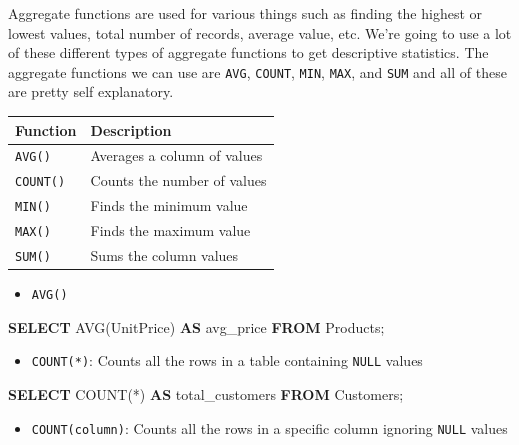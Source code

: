 \documentclass[]{book}
\newenvironment{Shaded}{\begin{snugshade}}{\end{snugshade}}
\newcommand{\KeywordTok}[1]{\textcolor[rgb]{0.13,0.29,0.53}{\textbf{{#1}}}}
\newcommand{\FunctionTok}[1]{\textcolor[rgb]{0.00,0.00,0.00}{{#1}}}
\newcommand{\NormalTok}[1]{{#1}}
\providecommand{\tightlist}{%
  \setlength{\itemsep}{0pt}\setlength{\parskip}{0pt}}
\theoremstyle{definition}
\theoremstyle{definition}
\theoremstyle{remark}
\begin{document}
Aggregate functions are used for various things such as finding the
highest or lowest values, total number of records, average value, etc.
We're going to use a lot of these different types of aggregate functions
to get descriptive statistics. The aggregate functions we can use are
\texttt{AVG}, \texttt{COUNT}, \texttt{MIN}, \texttt{MAX}, and
\texttt{SUM} and all of these are pretty self explanatory.

\begin{longtable}[]{@{}ll@{}}
\toprule
Function & Description\tabularnewline
\midrule
\endhead
\texttt{AVG()} & Averages a column of values\tabularnewline
\texttt{COUNT()} & Counts the number of values\tabularnewline
\texttt{MIN()} & Finds the minimum value\tabularnewline
\texttt{MAX()} & Finds the maximum value\tabularnewline
\texttt{SUM()} & Sums the column values\tabularnewline
\bottomrule
\end{longtable}

\begin{itemize}
\tightlist
\item
  \texttt{AVG()}
\end{itemize}

\begin{Shaded}
\begin{Highlighting}[]
\KeywordTok{SELECT} \FunctionTok{AVG}\NormalTok{(UnitPrice) }\KeywordTok{AS} \NormalTok{avg_price}
\KeywordTok{FROM} \NormalTok{Products;}
\end{Highlighting}
\end{Shaded}

\begin{itemize}
\tightlist
\item
  \texttt{COUNT(*)}: Counts all the rows in a table containing
  \texttt{NULL} values
\end{itemize}

\begin{Shaded}
\begin{Highlighting}[]
\KeywordTok{SELECT} \FunctionTok{COUNT}\NormalTok{(*) }\KeywordTok{AS} \NormalTok{total_customers}
\KeywordTok{FROM} \NormalTok{Customers;}
\end{Highlighting}
\end{Shaded}

\begin{itemize}
\tightlist
\item
  \texttt{COUNT(column)}: Counts all the rows in a specific column
  ignoring \texttt{NULL} values
\end{itemize}
\end{document}
